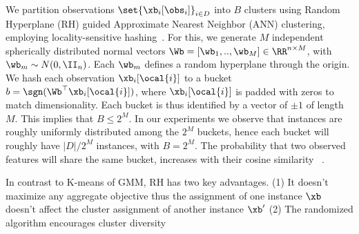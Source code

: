 \documentclass[letterpaper]{article}
\renewcommand{\cite}{\citep}
\begin{document}
We partition observations $\set{\xb_i[\obs_i]}_{i\in D}$ into $B$ clusters using Random Hyperplane (RH) guided Approximate Nearest Neighbor (ANN) clustering, employing locality-sensitive hashing~\cite{indyk1999approximate}. For this, we generate $M$ independent spherically distributed normal vectors $\Wb = [\wb_1,..,\wb_M] \in \RR^{n\times M}$, with $\wb_{m}\sim N(0,\II_{n})$. Each $\wb_m$ defines a random hyperplane through the origin. We hash each observation $\xb_i[\ocal{i}]$ to a bucket $b = \sgn(\Wb^\top \xb_i[\ocal{i}])$, where $\xb_i[\ocal{i}]$ is padded with zeros to match dimensionality. Each bucket is thus identified by a vector of $\pm 1$ of length $M$. This implies that $B\le 2^M$. In our experiments we observe that instances are roughly uniformly distributed among the $2^M$ buckets, hence each bucket will roughly have $|D|/2^M$ instances, with $B=2^M$. The probability that two observed features will share the same bucket, increases with their cosine similarity ~\citet[Section 3]{charikar2002similarity}.

In contrast to K-means of GMM, RH has two key advantages. (1) It doesn't maximize any aggregate objective thus the assignment of one instance $\xb$ doesn't affect the cluster assignment of another instance $\xb'$
(2) The randomized algorithm encourages cluster diversity
\end{document}
